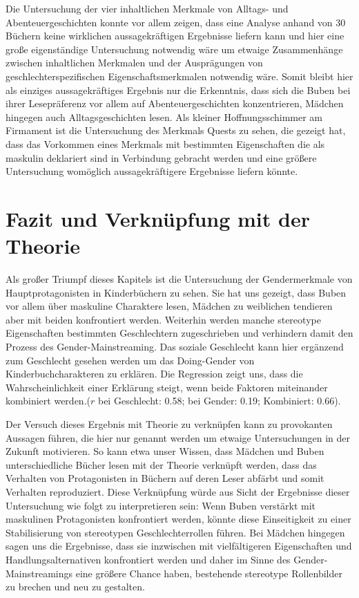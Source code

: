 Die Untersuchung der vier inhaltlichen Merkmale von Alltags- und
Abenteuergeschichten konnte vor allem zeigen, dass eine Analyse anhand
von 30 Büchern keine wirklichen aussagekräftigen Ergebnisse liefern kann
und hier eine große eigenständige Untersuchung notwendig wäre um etwaige
Zusammenhänge zwischen inhaltlichen Merkmalen und der Ausprägungen von
geschlechterspezifischen Eigenschaftsmerkmalen notwendig wäre. Somit
bleibt hier als einziges aussagekräftiges Ergebnis nur die Erkenntnis,
dass sich die Buben bei ihrer Lesepräferenz vor allem auf
Abenteuergeschichten konzentrieren, Mädchen hingegen auch
Alltagsgeschichten lesen. Als kleiner Hoffnungsschimmer am Firmament ist
die Untersuchung des Merkmals Quests zu sehen, die gezeigt hat, dass das
Vorkommen eines Merkmals mit bestimmten Eigenschaften die als maskulin
deklariert sind in Verbindung gebracht werden und eine größere
Untersuchung womöglich aussagekräftigere Ergebnisse liefern könnte.

\section{Fazit und Verknüpfung mit der Theorie}

Als großer Triumpf dieses Kapitels ist die Untersuchung der
Gendermerkmale von Hauptprotagonisten in Kinderbüchern zu sehen. Sie hat
uns gezeigt, dass Buben vor allem über maskuline Charaktere lesen,
Mädchen zu weiblichen tendieren aber mit beiden konfrontiert werden.
Weiterhin werden manche stereotype Eigenschaften bestimmten
Geschlechtern zugeschrieben und verhindern damit den Prozess des
Gender-Mainstreaming. Das soziale Geschlecht kann hier ergänzend zum
Geschlecht gesehen werden um das Doing-Gender von Kinderbuchcharakteren
zu erklären. Die Regression zeigt uns, dass die Wahrscheinlichkeit einer
Erklärung steigt, wenn beide Faktoren miteinander kombiniert werden.($r$
bei Geschlecht: 0.58; bei Gender: 0.19; Kombiniert: 0.66).

Der Versuch dieses Ergebnis mit Theorie zu verknüpfen kann zu
provokanten Aussagen führen, die hier nur genannt werden um etwaige
Untersuchungen in der Zukunft motivieren. So kann etwa unser Wissen,
dass Mädchen und Buben unterschiedliche Bücher lesen mit der Theorie
verknüpft werden, dass das Verhalten von Protagonisten in Büchern auf
deren Leser abfärbt und somit Verhalten reproduziert. Diese Verknüpfung
würde aus Sicht der Ergebnisse dieser Untersuchung wie folgt zu
interpretieren sein: Wenn Buben verstärkt mit maskulinen Protagonisten
konfrontiert werden, könnte diese Einseitigkeit zu einer Stabilisierung
von stereotypen Geschlechterrollen führen. Bei Mädchen hingegen sagen
uns die Ergebnisse, dass sie inzwischen mit vielfältigeren Eigenschaften
und Handlungsalternativen konfrontiert werden und daher im Sinne des
Gender-Mainstreamings eine größere Chance haben, bestehende stereotype
Rollenbilder zu brechen und neu zu gestalten.


